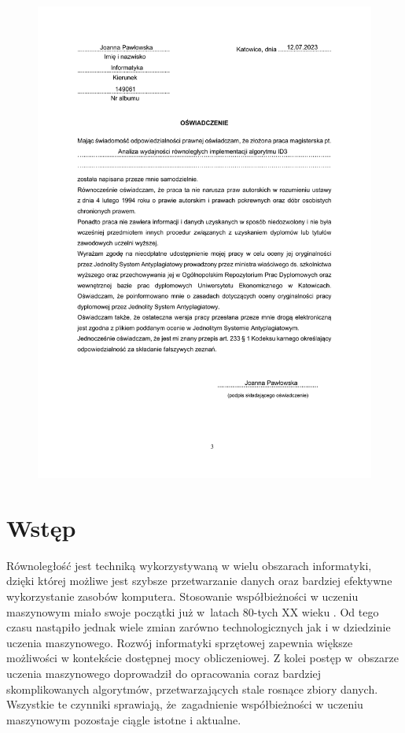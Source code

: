\documentclass[12pt]{article}
\begin{document}
\begin{figure}[H]
    \centering
	\includegraphics[width=\paperwidth,height=\paperheight,keepaspectratio]{plagiat.pdf}
\end{figure}
\newpage

\restoregeometry

\tableofcontents
\newpage

\cleardoublepage
{}
{}
\section*{Wstęp}
Równoległość jest techniką wykorzystywaną w wielu obszarach informatyki, dzięki której 
możliwe jest szybsze przetwarzanie danych oraz bardziej efektywne wykorzystanie zasobów komputera.
Stosowanie współbieżności w uczeniu maszynowym miało swoje początki już w~latach 80-tych XX wieku \cite{machine-learning-parallel-beginnings}.
Od tego czasu nastąpiło jednak wiele zmian zarówno technologicznych jak i w dziedzinie uczenia maszynowego.
Rozwój informatyki sprzętowej zapewnia większe możliwości w kontekście dostępnej mocy obliczeniowej.
Z kolei postęp w~obszarze uczenia maszynowego doprowadził do opracowania coraz bardziej skomplikowanych algorytmów, 
przetwarzających stale rosnące zbiory danych. Wszystkie te czynniki sprawiają, że~zagadnienie współbieżności w uczeniu 
maszynowym pozostaje ciągle istotne i aktualne.
\end{document}
